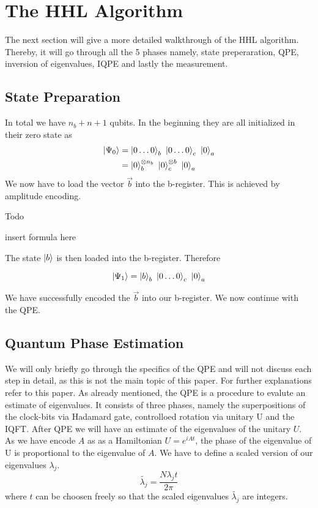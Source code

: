 \section{The HHL Algorithm}
The next section will give a more detailed walkthrough of the HHL algorithm.
Thereby, it will go through all the 5 phases namely, state preperaration, QPE, inversion of eigenvalues, IQPE and lastly the measurement.

\subsection{State Preparation}

In total we have $n_b + n + 1$ qubits. 
In the beginning they are all initialized in their zero state as
\begin{equation}
\begin{split}
\ket{\Psi_0} &= \ket{0\dots0}_b\ \ket{0\dots0}_c\ \ket{0}_a \\
&= \ket{0}_b^{{\otimes n_b}}\ \ket{0}_c^{\otimes b}\ \ket{0}_a 
\end{split}
\end{equation}
We now have to load the vector $\vec{b}$ into the b-register. 
This is achieved by amplitude encoding. 

Todo 

insert formula here

The state $\ket b$ is then loaded into the b-register. Therefore

\begin{equation}
\ket{\Psi_1} = \ket{b}_b\ \ket{0\dots0}_c\ \ket{0}_a
\end{equation}

We have successfully encoded the $\vec{b}$ into our b-register. 
We now continue with the QPE. 

\subsection{Quantum Phase Estimation}
We will only briefly go through the specifics of the QPE and will not discuss each step in detail, as this is not the main topic of this paper. 
For further explanations refer to this paper.
As already mentioned, the QPE is a procedure to evalute an estimate of eigenvalues. 
It consists of three phases, namely the superpositions of the clock-bits via Hadamard gate, controlloed rotation via unitary U and the IQFT.
After QPE we will have an estimate of the eigenvalues of the unitary $U$. 
As we have encode $A$ as as a Hamiltonian $U = e^{iAt}$, the phase of the eigenvalue of U is proportional to the eigenvalue of $A$.
We have to define a scaled version of our eigenvalues $\lambda_j$.
\begin{equation}
\widetilde{\lambda_j} = \frac {N\lambda_jt}{2\pi}
\end{equation}
where $t$ can be choosen freely so that the scaled eigenvalues $\widetilde{\lambda_j}$ are integers.

